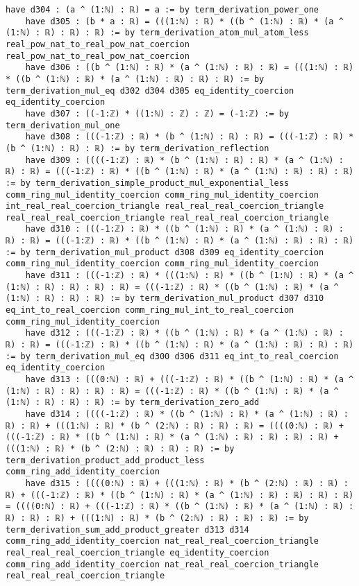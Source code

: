\documentclass{article}
\begin{document}
\begin{tcolorbox}[colback=white!10, width=\linewidth]
\begin{lstlisting}[language=Lean4]
    have d304 : (a ^ (1:ℕ) : ℝ) = a := by term_derivation_power_one
    have d305 : (b * a : ℝ) = (((1:ℕ) : ℝ) * ((b ^ (1:ℕ) : ℝ) * (a ^ (1:ℕ) : ℝ) : ℝ) : ℝ) := by term_derivation_atom_mul_atom_less real_pow_nat_to_real_pow_nat_coercion real_pow_nat_to_real_pow_nat_coercion
    have d306 : ((b ^ (1:ℕ) : ℝ) * (a ^ (1:ℕ) : ℝ) : ℝ) = (((1:ℕ) : ℝ) * ((b ^ (1:ℕ) : ℝ) * (a ^ (1:ℕ) : ℝ) : ℝ) : ℝ) := by term_derivation_mul_eq d302 d304 d305 eq_identity_coercion eq_identity_coercion
    have d307 : ((-1:ℤ) * ((1:ℕ) : ℤ) : ℤ) = (-1:ℤ) := by term_derivation_mul_one
    have d308 : (((-1:ℤ) : ℝ) * (b ^ (1:ℕ) : ℝ) : ℝ) = (((-1:ℤ) : ℝ) * (b ^ (1:ℕ) : ℝ) : ℝ) := by term_derivation_reflection
    have d309 : ((((-1:ℤ) : ℝ) * (b ^ (1:ℕ) : ℝ) : ℝ) * (a ^ (1:ℕ) : ℝ) : ℝ) = (((-1:ℤ) : ℝ) * ((b ^ (1:ℕ) : ℝ) * (a ^ (1:ℕ) : ℝ) : ℝ) : ℝ) := by term_derivation_simple_product_mul_exponential_less comm_ring_mul_identity_coercion comm_ring_mul_identity_coercion int_real_real_coercion_triangle real_real_real_coercion_triangle real_real_real_coercion_triangle real_real_real_coercion_triangle
    have d310 : (((-1:ℤ) : ℝ) * ((b ^ (1:ℕ) : ℝ) * (a ^ (1:ℕ) : ℝ) : ℝ) : ℝ) = (((-1:ℤ) : ℝ) * ((b ^ (1:ℕ) : ℝ) * (a ^ (1:ℕ) : ℝ) : ℝ) : ℝ) := by term_derivation_mul_product d308 d309 eq_identity_coercion comm_ring_mul_identity_coercion comm_ring_mul_identity_coercion
    have d311 : (((-1:ℤ) : ℝ) * (((1:ℕ) : ℝ) * ((b ^ (1:ℕ) : ℝ) * (a ^ (1:ℕ) : ℝ) : ℝ) : ℝ) : ℝ) = (((-1:ℤ) : ℝ) * ((b ^ (1:ℕ) : ℝ) * (a ^ (1:ℕ) : ℝ) : ℝ) : ℝ) := by term_derivation_mul_product d307 d310 eq_int_to_real_coercion comm_ring_mul_int_to_real_coercion comm_ring_mul_identity_coercion
    have d312 : (((-1:ℤ) : ℝ) * ((b ^ (1:ℕ) : ℝ) * (a ^ (1:ℕ) : ℝ) : ℝ) : ℝ) = (((-1:ℤ) : ℝ) * ((b ^ (1:ℕ) : ℝ) * (a ^ (1:ℕ) : ℝ) : ℝ) : ℝ) := by term_derivation_mul_eq d300 d306 d311 eq_int_to_real_coercion eq_identity_coercion
    have d313 : (((0:ℕ) : ℝ) + (((-1:ℤ) : ℝ) * ((b ^ (1:ℕ) : ℝ) * (a ^ (1:ℕ) : ℝ) : ℝ) : ℝ) : ℝ) = (((-1:ℤ) : ℝ) * ((b ^ (1:ℕ) : ℝ) * (a ^ (1:ℕ) : ℝ) : ℝ) : ℝ) := by term_derivation_zero_add
    have d314 : ((((-1:ℤ) : ℝ) * ((b ^ (1:ℕ) : ℝ) * (a ^ (1:ℕ) : ℝ) : ℝ) : ℝ) + (((1:ℕ) : ℝ) * (b ^ (2:ℕ) : ℝ) : ℝ) : ℝ) = ((((0:ℕ) : ℝ) + (((-1:ℤ) : ℝ) * ((b ^ (1:ℕ) : ℝ) * (a ^ (1:ℕ) : ℝ) : ℝ) : ℝ) : ℝ) + (((1:ℕ) : ℝ) * (b ^ (2:ℕ) : ℝ) : ℝ) : ℝ) := by term_derivation_product_add_product_less comm_ring_add_identity_coercion
    have d315 : ((((0:ℕ) : ℝ) + (((1:ℕ) : ℝ) * (b ^ (2:ℕ) : ℝ) : ℝ) : ℝ) + (((-1:ℤ) : ℝ) * ((b ^ (1:ℕ) : ℝ) * (a ^ (1:ℕ) : ℝ) : ℝ) : ℝ) : ℝ) = ((((0:ℕ) : ℝ) + (((-1:ℤ) : ℝ) * ((b ^ (1:ℕ) : ℝ) * (a ^ (1:ℕ) : ℝ) : ℝ) : ℝ) : ℝ) + (((1:ℕ) : ℝ) * (b ^ (2:ℕ) : ℝ) : ℝ) : ℝ) := by term_derivation_sum_add_product_greater d313 d314 comm_ring_add_identity_coercion nat_real_real_coercion_triangle real_real_real_coercion_triangle eq_identity_coercion comm_ring_add_identity_coercion nat_real_real_coercion_triangle real_real_real_coercion_triangle

\end{lstlisting}
\end{tcolorbox}
\end{document}
